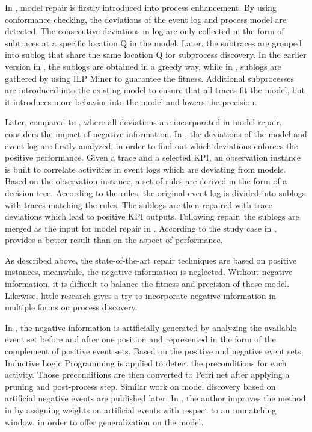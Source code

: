 In  \cite{fahland2012repairing}, model repair is firstly introduced into process enhancement. By using conformance checking, the deviations of the event log and process model are detected. The consecutive deviations in log  are only collected in the form of subtraces at a specific location Q in the model. Later, the subtraces are grouped into sublog that share the same location Q for subprocess discovery. In the earlier version in  \cite{fahland2012repairing}, the sublogs are obtained in a greedy way, while in  \cite{fahland2015model}, sublogs are gathered by using ILP Miner to guarantee the fitness. Additional subprocesses are introduced into the existing model to ensure that all traces fit the model, but it introduces more behavior into the model and lowers the precision.

Later, compared to  \cite{fahland2012repairing, fahland2015model}, where all deviations are incorporated in model repair,  \cite{dees2017enhancing} considers the impact of negative information.  In  \cite{dees2017enhancing}, the deviations of the model and event log are firstly analyzed, in order to find out which deviations enforces the positive performance. Given a trace and a selected KPI, an observation instance is built to correlate  activities in event logs which are deviating from models. Based on the observation instance,  a set of rules are derived in the form of a decision tree. According to the rules, the original event log is divided into sublogs with traces matching the rules. The sublogs are then repaired with trace deviations which lead to positive KPI outputs. Following repair, the sublogs are merged as the input for model repair in  \cite{fahland2015model}. According to the study case in  \cite{dees2017enhancing}, \cite{dees2017enhancing} provides a better result than  \cite{fahland2015model} on the aspect of performance. 
 
As described above, the state-of-the-art repair techniques are based on positive instances, meanwhile, the negative information is neglected. Without negative information, it is difficult to balance the fitness and precision of those model. Likewise, little research gives a try to incorporate negative information in multiple forms on process discovery.

In  \cite{goedertier2009robust}, the negative information is artificially generated by analyzing the available event set before and after one position and represented in the form of the complement of positive event sets. Based on the positive and negative event sets, Inductive Logic Programming is applied to detect the preconditions for each activity. Those preconditions are then converted to Petri net after applying a pruning and post-process step. Similar work on model discovery based on artificial negative events are published later. In  \cite{vanden2014determining}, the author improves the method in  \cite{goedertier2009robust} by assigning weights on artificial events with respect to an unmatching window, in order to offer generalization on the model. 

